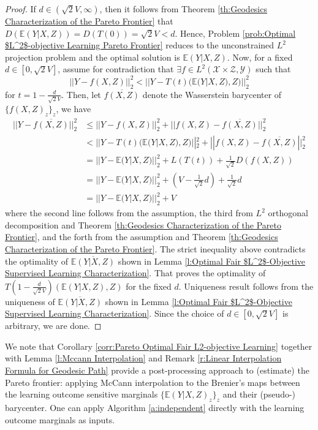 \documentclass[twoside,11pt]{article}
\begin{document}
\begin{proof}
If $d \in (\sqrt{2}V, \infty)$, then it follows from Theorem \ref{th:Geodesics Characterization of the Pareto Frontier} that $D(\mathbb{E}(Y|X,Z)) = D(T(0)) = \sqrt{2}V < d$. Hence, Problem \ref{prob:Optimal $L^2$-objective Learning Pareto Frontier} reduces to the unconstrained $L^2$ projection problem and the optimal solution is $\mathbb{E}(Y|X,Z)$. Now, for a fixed $d \in [0,\sqrt{2}V]$, assume for contradiction that $\exists f \in L^2(\mathcal{X} \times \mathcal{Z}, \mathcal{Y})$ such that $$||Y-f(X,Z)||_2^2 < ||Y - T(t)(\mathbb{E}(Y|X,Z),Z)||_2^2$$ for $t = 1- \frac{d}{\sqrt{2}V}$. Then, let $\overline{f(X,Z)}$ denote the Wasserstein barycenter of $\{f(X,Z)_z\}_z$, we have \begin{align*}
||Y - \overline{f(X,Z)}||_2^2 &  \leq ||Y - f(X,Z)||_2^2 + ||f(X,Z)- \overline{f(X,Z)}||_2^2\\
& < ||Y - T(t)(\mathbb{E}(Y|X,Z), Z)||_2^2 + ||f(X,Z)- \overline{f(X,Z)}||_2^2\\
& = ||Y - \mathbb{E}(Y|X,Z)||_2^2 + L(T(t)) + \frac{1}{\sqrt{2}}D(f(X,Z))\\
& = ||Y - \mathbb{E}(Y|X,Z)||_2^2 + (V - \frac{1}{\sqrt{2}}d) + \frac{1}{\sqrt{2}}d\\
& = ||Y - \mathbb{E}(Y|X,Z)||_2^2 + V
\end{align*}
where the second line follows from the assumption, the third from $L^2$ orthogonal decomposition and Theorem \ref{th:Geodesics Characterization of the Pareto Frontier}, and the forth from the assumption and Theorem \ref{th:Geodesics Characterization of the Pareto Frontier}. The strict inequality above contradicts the optimality of $\overline{\mathbb{E}(Y|X,Z)}$ shown in Lemma \ref{l:Optimal Fair $L^2$-Objective Supervised Learning Characterization}. That proves the optimality of $T(1- \frac{d}{\sqrt{2}V})(\mathbb{E}(Y|X,Z),Z)$ for the fixed $d$. Uniqueness result follows from the uniqueness of $\overline{\mathbb{E}(Y|X,Z)}$ shown in Lemma \ref{l:Optimal Fair $L^2$-Objective Supervised Learning Characterization}. Since the choice of $d \in [0,\sqrt{2}V]$ is arbitrary, we are done.
\end{proof}

We note that Corollary \ref{corr:Pareto Optimal Fair L2-objective Learning} together with Lemma \ref{l:Mccann Interpolation} and Remark \ref{r:Linear Interpolation Formula for Geodesic Path} provide a post-processing approach to (estimate) the Pareto frontier: applying McCann interpolation to the Brenier's maps between the learning outcome sensitive marginals $\{\mathbb{E}(Y|X,Z)_z\}_z$ and their (pseudo-) barycenter. One can apply Algorithm \ref{a:independent} directly with the learning outcome marginals as inputs.
\end{document}
